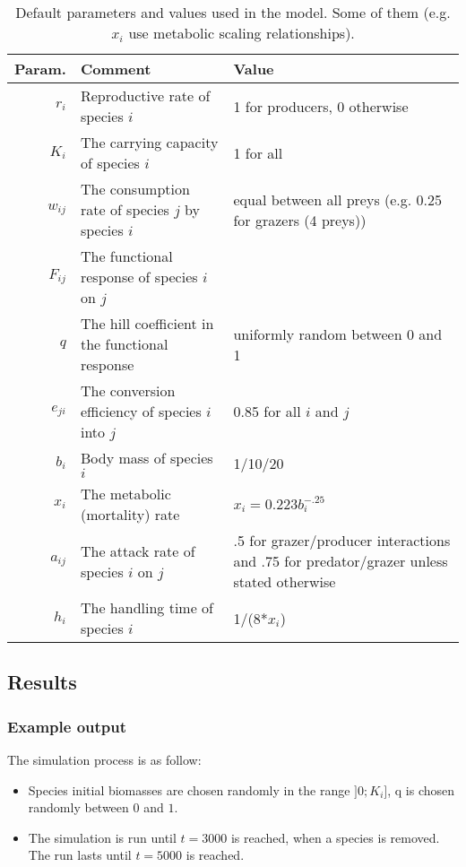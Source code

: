 \documentclass[a4paper,11pt]{article}
\begin{document}
    \begin{sidewaystable}[s]
      \begin{tabular}{r | l | l}
        Param.    & Comment                                               & Value  \\
        \hline 
        $r_i$     & Reproductive rate of species $i$                      & 1 for producers, 0 otherwise \\
        $K_i$     & The carrying capacity of species $i$                  & 1 for all \\
        $w_{ij}$  & The consumption rate of species $j$ by species $i$    & equal between all preys (e.g. 0.25 for grazers (4 preys)) \\
        $F_{ij}$  & The functional response of species $i$ on $j$         & \\
        $q$       & The hill coefficient in the functional response       & uniformly random between 0 and 1 \\
        $e_{ji}$  & The conversion efficiency of species $i$ into $j$     & 0.85 for all $i$ and $j$ \\
        $b_{i}$   & Body mass of species $i$                              & 1/10/20 \\
        $x_i$     & The metabolic (mortality) rate                        & $x_i = 0.223 b_i^{-.25}$ \\
        $a_{ij}$  & The attack rate of species $i$ on $j$                 & .5 for grazer/producer interactions and .75 for predator/grazer unless stated otherwise \\
        $h_i$     & The handling time of species $i$                      & 1/(8*$x_i$) 
      \end{tabular}
      \caption{Default parameters and values used in the model. Some of them 
(e.g. $x_i$ use metabolic scaling relationships). }
      \label{tab:parameters}
    \end{sidewaystable}
    
    \subsection{Results}
      \subsubsection{Example output}
      
        The simulation process is as follow: 
        \begin{itemize}
          \item Species initial biomasses are chosen randomly in the range 
                $]0;K_i]$, q is chosen randomly between $0$ and $1$.
          \item The simulation is run until $t=3000$ is reached, when a species 
                is removed. The run lasts until $t=5000$ is reached. 
        \end{itemize}
        
\end{document}
